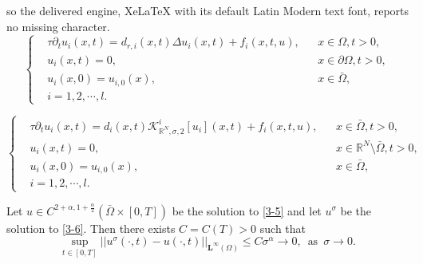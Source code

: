 \documentclass[10pt,a4paper]{amsart}
\begin{document}
so the delivered engine, XeLaTeX with its default Latin Modern text font, reports no missing character.
\begin{equation}\label{3-5}
\left\{
\begin{aligned}
&\tau\partial_{t}u_{i}(x,t)= d_{r,i}(x,t)\Delta u_{i}(x,t) + f_{i}(x,t,u), && x\in\Omega, t> 0,\\
&u_{i}(x,t)=0,  && x\in\partial\Omega, t>0,\\
&u_{i}(x,0)=u_{i,0}(x),  && x\in \bar\Omega,\\
&i=1,2,\cdots,l.
\end{aligned}
\right.
\end{equation}

\begin{equation}\label{3-6}
\left\{
\begin{aligned}
&\tau\partial_{t}u_{i}(x,t)= d_{i}(x,t)\mathcal{K}^{i}_{\mathbb{R}^{N},\sigma,2}[u_{i}](x,t) + f_{i}(x,t,u), && x\in \bar\Omega, t> 0,\\
&u_{i}(x,t)=0,  &&  x\in\mathbb{R}^{N}\setminus \bar\Omega, t>0,\\
&u_{i}(x,0)=u_{i,0}(x),  && x\in \bar\Omega,\\
&i=1,2,\cdots,l.
\end{aligned}
\right.
\end{equation}

\begin{theorem}\label{THM3.4}
Let $u \in C^{2+\alpha, 1+\frac{\alpha}{2}}(\bar{\Omega}\times [0,T])$ be the solution to \eqref{3-5} and let $u^{\sigma}$ be the solution to \eqref{3-6}.
Then there exists $C=C(T)>0$ such that
\begin{equation*}
\sup_{t\in[0,T]} \left|\left| u^{\sigma}(\cdot,t) - u(\cdot,t)\right|\right|_{\mathbf{L}^{\infty}(\Omega)} \leq C\sigma^{\alpha} \to 0,
\enspace \text{as} \enspace \sigma \to 0.
\end{equation*}
\end{theorem}
\end{document}
